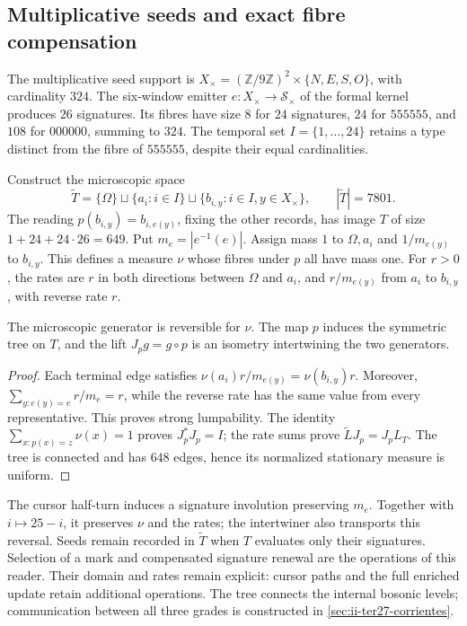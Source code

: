 \subsection{Multiplicative seeds and exact fibre compensation}
\label{sec:ii-ter27-fibras}

The multiplicative seed support is
$X_\times=(\mathbb Z/9\mathbb Z)^2\times\{N,E,S,O\}$, with
cardinality $324$. The six-window emitter
$e:X_\times\to\mathcal S_\times$ of the formal kernel produces
$26$ signatures. Its fibres have size $8$ for $24$ signatures,
$24$ for $555555$, and $108$ for $000000$, summing to $324$.
The temporal set $I=\{1,\ldots,24\}$ retains a type distinct from
the fibre of $555555$, despite their equal cardinalities.

Construct the microscopic space
\[
 \widetilde T=\{\Omega\}\sqcup\{a_i:i\in I\}
 \sqcup\{b_{i,y}:i\in I,y\in X_\times\},\qquad|\widetilde T|=7801.
\]
The reading $p(b_{i,y})=b_{i,e(y)}$, fixing the other records, has
image $T$ of size $1+24+24\cdot26=649$. Put $m_e=|e^{-1}(e)|$.
Assign mass $1$ to $\Omega,a_i$ and $1/m_{e(y)}$ to $b_{i,y}$.
This defines a measure $\nu$ whose fibres under $p$ all have mass one.
For $r>0$, the rates are $r$ in both directions between $\Omega$ and
$a_i$, and $r/m_{e(y)}$ from $a_i$ to $b_{i,y}$, with reverse rate $r$.

\begin{proposition}
\label{prop:ii-ter27-arbol}
The microscopic generator is reversible for $\nu$. The map $p$ induces
the symmetric tree on $T$, and the lift $J_pg=g\circ p$ is an isometry
intertwining the two generators.
\end{proposition}
\begin{proof}
Each terminal edge satisfies
$\nu(a_i)r/m_{e(y)}=\nu(b_{i,y})r$. Moreover,
$\sum_{y:e(y)=e}r/m_e=r$, while the reverse rate has the same value
from every representative. This proves strong lumpability.
The identity $\sum_{x:p(x)=z}\nu(x)=1$ proves $J_p^*J_p=I$;
the rate sums prove $\widetilde L J_p=J_pL_T$. The tree is connected
and has $648$ edges, hence its normalized stationary measure is uniform.
\end{proof}
The cursor half-turn induces a signature involution preserving $m_e$.
Together with $i\mapsto25-i$, it preserves $\nu$ and the rates; the
intertwiner also transports this reversal. Seeds remain recorded in
$\widetilde T$ when $T$ evaluates only their signatures.
Selection of a mark and compensated signature renewal are the operations
of this reader. Their domain and rates remain explicit: cursor paths
and the full enriched update retain additional operations. The tree
connects the internal bosonic levels; communication between all three
grades is constructed in \ref{sec:ii-ter27-corrientes}.

